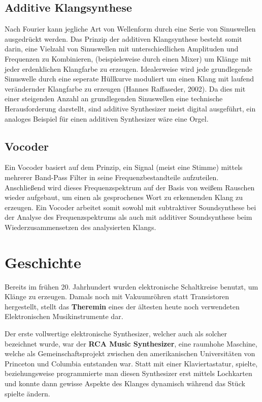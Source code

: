 \subsection{Additive Klangsynthese}
\label{sec:org74d716b}
Nach Fourier kann jegliche Art von Wellenform durch eine Serie von Sinuswellen ausgedrückt werden. Das Prinzip der additiven Klangsynthese besteht somit darin, eine Vielzahl von Sinuswellen mit unterschiedlichen Amplituden und Frequenzen zu Kombinieren, (beispielsweise durch einen Mixer) um Klänge mit jeder erdenklichen Klangfarbe zu erzeugen. Idealerweise wird jede grundlegende Sinuswelle durch eine seperate Hüllkurve moduliert um einen Klang mit laufend verändernder Klangfarbe zu erzeugen (Hannes Raffaseder, 2002). Da dies mit einer steigenden Anzahl an grundlegenden Sinuswellen eine technische Herausforderung darstellt, sind additive Synthesizer meist digital ausgeführt, ein analoges Beispiel für einen additiven Synthesizer wäre eine Orgel.

\subsection{Vocoder}
\label{sec:org61979ad}
Ein Vocoder basiert auf dem Prinzip, ein Signal (meist eine Stimme) mittels mehrerer Band-Pass Filter in seine Frequenzbestandteile aufzuteilen. Anschließend wird dieses Frequenzspektrum auf der Basis von weißem Rauschen wieder aufgebaut, um einen als gesprochenes Wort zu erkennenden Klang zu erzeugen. Ein Vocoder arbeitet somit sowohl mit subtraktiver Soundsynthese bei der Analyse des Frequenzspektrums als auch mit additiver Soundsynthese beim Wiederzusammensetzen des analysierten Klangs.

\section{Geschichte}
\label{sec:org65a0469}
Bereits im frühen 20. Jahrhundert wurden elektronische Schaltkreise benutzt, um Klänge zu erzeugen. Damals noch mit Vakuumröhren statt Transistoren hergestellt, stellt das \textbf{Theremin} eines der ältesten heute noch verwendeten Elektronischen Musikinstrumente dar.

Der erste vollwertige elektronische Synthesizer, welcher auch als solcher bezeichnet wurde, war der \textbf{RCA Music Synthesizer}, eine raumhohe Maschine, welche als Gemeinschaftsprojekt zwischen den amerikanischen Universitäten von Princeton und Columbia entstanden war. Statt mit einer Klaviertastatur, spielte, beziehungsweise programmierte man diesen Synthesizer erst mittels Lochkarten und konnte dann gewisse Aspekte des Klanges dynamisch während das Stück spielte ändern.

